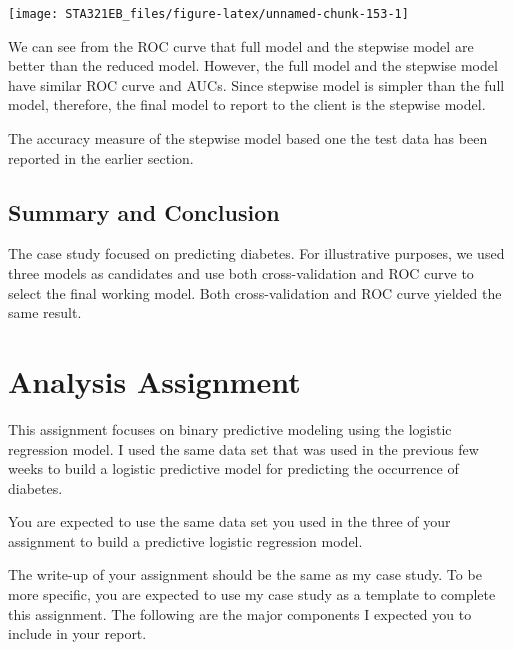 \documentclass[
]{book}
\begin{document}
\begin{center}\texttt{[image: STA321EB\_files/figure-latex/unnamed-chunk-153-1]} \end{center}

We can see from the ROC curve that full model and the stepwise model are better than the reduced model. However, the full model and the stepwise model have similar ROC curve and AUCs. Since stepwise model is simpler than the full model, therefore, the final model to report to the client is the stepwise model.

The accuracy measure of the stepwise model based one the test data has been reported in the earlier section.

\hypertarget{summary-and-conclusion-1}{%
\subsection{Summary and Conclusion}\label{summary-and-conclusion-1}}

The case study focused on predicting diabetes. For illustrative purposes, we used three models as candidates and use both cross-validation and ROC curve to select the final working model. Both cross-validation and ROC curve yielded the same result.

\hypertarget{analysis-assignment-2}{%
\section{Analysis Assignment}\label{analysis-assignment-2}}

This assignment focuses on binary predictive modeling using the logistic regression model. I used the same data set that was used in the previous few weeks to build a logistic predictive model for predicting the occurrence of diabetes.

You are expected to use the same data set you used in the three of your assignment to build a predictive logistic regression model.

The write-up of your assignment should be the same as my case study. To be more specific, you are expected to use my case study as a template to complete this assignment. The following are the major components I expected you to include in your report.
\end{document}
